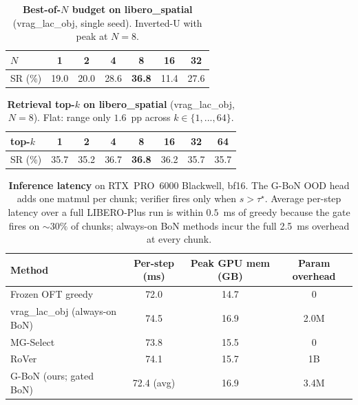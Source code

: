 \begin{table}[h]
\centering
\caption{\textbf{Best-of-$N$ budget on libero\_spatial} (vrag\_lac\_obj,
single seed). Inverted-U with peak at $N=8$.}
\label{tab:abl_N}
\begin{tabular}{lcccccc}
\toprule
$N$ & 1 & 2 & 4 & \textbf{8} & 16 & 32 \\
\midrule
SR (\%) & 19.0 & 20.0 & 28.6 & \textbf{36.8} & 11.4 & 27.6 \\
\bottomrule
\end{tabular}
\end{table}

\begin{table}[h]
\centering
\caption{\textbf{Retrieval top-$k$ on libero\_spatial} (vrag\_lac\_obj,
$N=8$). Flat: range only $1.6$~pp across $k\in\{1,...,64\}$.}
\label{tab:abl_k}
\begin{tabular}{lccccccc}
\toprule
top-$k$ & 1 & 2 & 4 & 8 & 16 & 32 & 64 \\
\midrule
SR (\%) & 35.7 & 35.2 & 36.7 & \textbf{36.8} & 36.2 & 35.7 & 35.7 \\
\bottomrule
\end{tabular}
\end{table}

\begin{table}[h]
\centering
\caption{\textbf{Inference latency} on RTX~PRO~6000 Blackwell, bf16. The
G-BoN OOD head adds one matmul per chunk; verifier fires only when
$s>\tau^\star$. Average per-step latency over a full LIBERO-Plus run is
within $0.5$~ms of greedy because the gate fires on $\sim 30\%$ of
chunks; always-on BoN methods incur the full 2.5~ms overhead at every
chunk.}
\label{tab:latency}
\begin{tabular}{lccc}
\toprule
Method & Per-step (ms) & Peak GPU mem (GB) & Param overhead \\
\midrule
Frozen OFT greedy                       & 72.0           & 14.7 & 0 \\
vrag\_lac\_obj (always-on BoN)          & 74.5           & 16.9 & 2.0M \\
MG-Select \citep{mgselect2026}                & 73.8 & 15.5 & 0 \\
RoVer \citep{rover2026}                       & 74.1 & 15.7 & 1B \\
G-BoN (ours; gated BoN)                 & 72.4 (avg)     & 16.9 & 3.4M \\
\bottomrule
\end{tabular}
\end{table}

